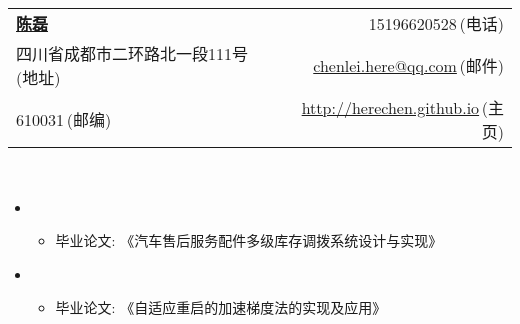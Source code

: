 \documentclass[letterpaper,11pt]{article}
\begin{document}

\newcommand{\myheader}{
\begin{tabular*}{7.0in}{l@{\extracolsep{\fill}}r}
  \textbf{\href{http://herechen.github.io}{\LARGE 陈磊}} & 15196620528$\,${\color{labelgrey}(电话)} \\
  四川省成都市二环路北一段111号$\,${\color{labelgrey}(地址)} & \href{mailto:chenlei.here@qq.com}{chenlei.here@qq.com}$\,${\color{labelgrey}(邮件)} \\
  610031$\,${\color{labelgrey}(邮编)} & \href{http://herechen.github.io}{http://herechen.github.io}$\,${\color{labelgrey}(主页)} \\
  \end{tabular*}\\\vspace{0.1in}}

\myheader

  \begin{itemize}[leftmargin=*]
    \item
      {\footnotesize
      \begin{itemize}
        \item 毕业论文: 《汽车售后服务配件多级库存调拨系统设计与实现》
      \end{itemize}
      }
    \item
      {\footnotesize
      \begin{itemize}
        \item 毕业论文: 《自适应重启的加速梯度法的实现及应用》
      \end{itemize}
      }
  \end{itemize}
\end{document}

